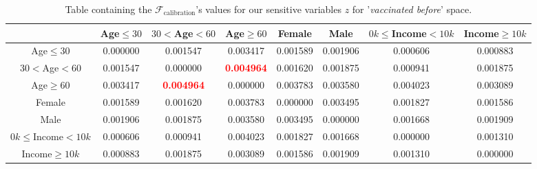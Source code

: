 \documentclass{article}
\begin{document}
\begin{center}
\begin{table}[H]
\begin{adjustbox}{max width=\textwidth}
    \begin{tabular}{ |c| c c c c c c c|}
    \hline
      & Age$\leq30$ &    $30<$Age$<60$ &     Age$\geq60$ &    Female &      Male &   $0k\leq$Income$<10k$ &    Income$\geq10k$  \\
    \hline
     Age$\leq30$ &  0.000000 &  0.001547 &  0.003417 &  0.001589 &  0.001906 &  0.000606 &  0.000883 \\
    \hline
    $30<$Age$<60$ &  0.001547 &  0.000000 &  \textbf{\textcolor{red}{0.004964}} &  0.001620 &  0.001875 &  0.000941 &  0.001875 \\
    \hline
    Age$\geq60$ &  0.003417 &  \textbf{\textcolor{red}{0.004964}} &  0.000000 &  0.003783 &  0.003580 &  0.004023 &  0.003089 \\
    \hline
    Female &  0.001589 &  0.001620 &  0.003783 &  0.000000 &  0.003495 &  0.001827 &  0.001586 \\
    \hline
    Male &  0.001906 &  0.001875 &  0.003580 &  0.003495 &  0.000000 &  0.001668 &  0.001909 \\
    \hline
    $0k\leq$Income$<10k$ &  0.000606 &  0.000941 &  0.004023 &  0.001827 &  0.001668 &  0.000000 &  0.001310 \\
    \hline
    Income$\geq10k$ &  0.000883 &  0.001875 &  0.003089 &  0.001586 &  0.001909 &  0.001310 &  0.000000 
    \\ \hline
    \end{tabular}
    \end{adjustbox}
\caption{Table containing the $\mathcal{F}_{\text{calibration}}$'s values for our sensitive variables $z$ for '\textit{vaccinated before}' space.}
\label{tab:16}
\end{table}
\end{center}
\end{document}
